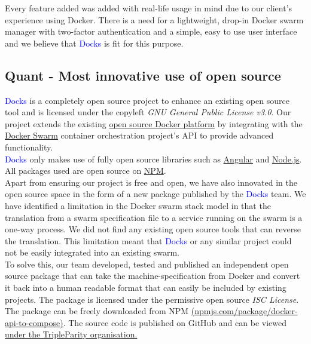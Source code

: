 \documentclass[]{article}
\newcommand{\docks}{\textcolor{Blue}{Docks} }
\newcommand{\docker}{Docker }
\begin{document}
Every feature added was added with real-life usage in mind due to our client's experience using Docker. There is a need for a lightweight, drop-in Docker swarm manager with two-factor authentication and a simple, easy to use user interface and we believe that \docks is fit for this purpose.

\subsection{Quant - Most innovative use of open source}
\docks is a completely open source project to enhance an existing open source tool and is licensed under the copyleft \textit{GNU General Public License v3.0}. Our project extends the existing \href{https://github.com/docker}{open source Docker platform} by integrating with the \href{https://github.com/docker/swarm}{Docker Swarm} container orchestration project's API to provide advanced functionality.\\

\docks only makes use of fully open source libraries such as \href{https://github.com/angular}{Angular} and \href{https://github.com/nodejs}{Node.js}. All packages used are open source on \href{https://www.npmjs.com/}{NPM}. \\

Apart from ensuring our project is free and open, we have also innovated in the open source space in the form of a new package published by the \docks team. We have identified a limitation in the Docker swarm stack model in that the translation from a swarm specification file to a service running on the swarm is a one-way process. We did not find any existing open source tools that can reverse the translation. This limitation meant that \docks or any similar project could not be easily integrated into an existing swarm.\\
 
To solve this, our team developed, tested and published an independent open source package that can take the machine-specification from \docker and convert it back into a human readable format that can easily be included by existing projects. The package is licensed under the permissive open source \textit{ISC License}. The package can be freely downloaded from NPM \href{https://www.npmjs.com/package/docker-api-to-compose}{(npmjs.com/package/docker-api-to-compose)}. The source code is published on GitHub and can be viewed \href{https://github.com/TripleParity/docker-api-to-compose}{under the TripleParity organisation.}
\end{document}
